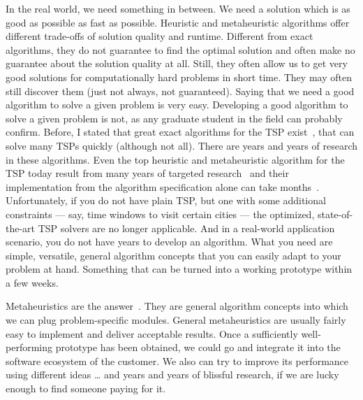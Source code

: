 In the real world, we need something in between.
We need a solution which is as good as possible as fast as possible.
Heuristic and metaheuristic algorithms offer different trade-offs of solution quality and runtime.
Different from exact algorithms, they do not guarantee to find the optimal solution and often make no guarantee about the solution quality at all.
Still, they often allow us to get very good solutions for computationally hard problems in short time.
They may often still discover them (just not always, not guaranteed).%
\endhsection%
%
%
%
Saying that we need a good algorithm to solve a given problem is very easy.
Developing a good algorithm to solve a given problem is not, as any graduate student in the field can probably confirm.
Before, I stated that great exact algorithms for the \gls{TSP} exist~\cite{CEG2007CWDPIFTSPT,C2021WT}, that can solve many TSPs quickly (although not all).
There are years and years of research in these algorithms.
Even the top heuristic and metaheuristic algorithm for the \gls{TSP} today result from many years of targeted research~\cite{H2009GKOSFTLKTH,NK2013APGAUEACFTTSP,W2016BNMDPCADIM} and their implementation from the algorithm specification alone can take months~\cite{WWLC2019IIIOADTM}.
Unfortunately, if you do not have plain \gls{TSP}, but one with some additional constraints --- say, time windows to visit certain cities --- the optimized, state-of-the-art \gls{TSP} solvers are no longer applicable.
And in a real-world application scenario, you do not have years to develop an algorithm.
What you need are simple, versatile, general algorithm concepts that you can easily adapt to your problem at hand.
Something that can be turned into a working prototype within a few weeks.

Metaheuristics are the answer~\cite{W2009GOATAA,MF2004HTSIMH}.
They are general algorithm concepts into which we can plug problem-specific modules.
General metaheuristics are usually fairly easy to implement and deliver acceptable results.
Once a sufficiently well-performing prototype has been obtained, we could go and integrate it into the software ecosystem of the customer.
We also can try to improve its performance using different ideas {\dots} and years and years of blissful research, if we are lucky enough to find someone paying for it.%
\endhsection%
\endhsection%
%
